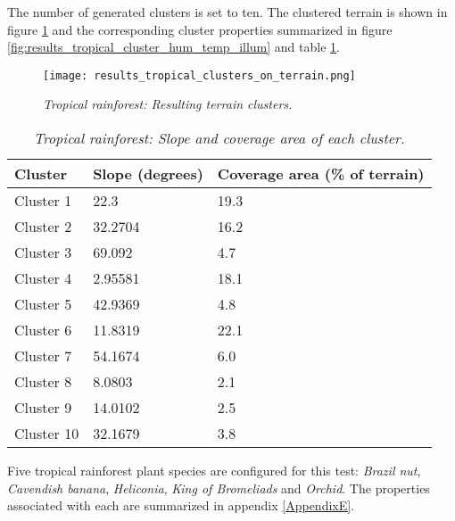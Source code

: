 The number of generated clusters is set to ten. The clustered terrain is shown in figure \ref{fig:results_tropical_terrain_clusters} and the corresponding cluster properties summarized in figure \ref{fig:results_tropical_cluster_hum_temp_illum} and table \ref{tab:results_tropical_cluster_slope_covarea}. 

\begin{figure}[htb!]
\center
	\texttt{[image: results\_tropical\_clusters\_on\_terrain.png]}
	\caption{ \textit{Tropical rainforest: Resulting terrain clusters.} }
	\label{fig:results_tropical_terrain_clusters}
\end{figure}

\begin{table}[htb!]
  \centering
	    \begin{tabular}{|p{5cm}|p{5cm}|p{5cm}|}
		\hline	
  	    \textbf{Cluster} & \textbf{Slope (degrees)} & \textbf{Coverage area (\% of terrain)} \\
  	    \hline	
		Cluster 1 & 22.3 & 19.3 \\
		\hline
		Cluster 2 & 32.2704 & 16.2 \\
		\hline
		Cluster 3 & 69.092 & 4.7 \\
		\hline
		Cluster 4 & 2.95581 & 18.1 \\
		\hline
		Cluster 5 & 42.9369 & 4.8 \\
		\hline
		Cluster 6 & 11.8319 & 22.1 \\
		\hline
		Cluster 7 & 54.1674 & 6.0 \\
		\hline
		Cluster 8 & 8.0803 & 2.1 \\
		\hline
		Cluster 9 & 14.0102 & 2.5 \\
		\hline
		Cluster 10 & 32.1679 & 3.8 \\
		\hline
		\end{tabular}
		\caption{\textit{Tropical rainforest: Slope and coverage area of each cluster.}}
	  \label{tab:results_tropical_cluster_slope_covarea}
\end{table}

Five tropical rainforest plant species are configured for this test: \textit{Brazil nut}, \textit{Cavendish banana}, \textit{Heliconia}, \textit{King of Bromeliads} and \textit{Orchid}. The properties associated with each are summarized in appendix \ref{AppendixE}.\\

